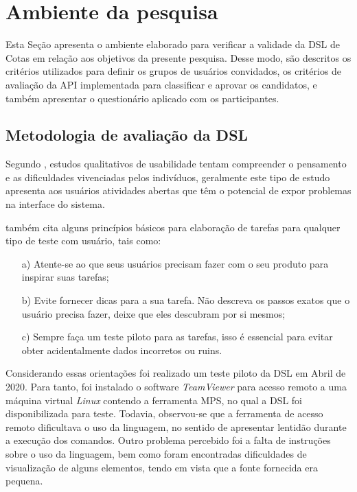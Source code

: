 \section{Ambiente da pesquisa}
\label{ambiente}
 Esta Seção apresenta o ambiente elaborado para verificar a validade da DSL de Cotas em relação aos objetivos da presente pesquisa. Desse modo, são descritos os critérios utilizados para definir os grupos de usuários convidados, os critérios de avaliação da \gls{API} implementada para classificar e aprovar os candidatos, e também apresentar o questionário aplicado com os participantes.
 
\subsection{Metodologia de avaliação da DSL}
\label{metododsl}

 Segundo , estudos qualitativos de usabilidade tentam compreender o pensamento e as dificuldades vivenciadas pelos indivíduos, geralmente este tipo de estudo apresenta aos usuários atividades abertas que têm o potencial de expor problemas na interface do sistema. 
 
  também cita alguns princípios básicos para elaboração de tarefas para qualquer tipo de teste com usuário, tais como:
 
 \begin{enumerate}
    \item[a)] Atente-se ao que seus usuários precisam fazer com o seu produto para inspirar suas tarefas;
    \item[b)] Evite fornecer dicas para a sua tarefa. Não descreva os passos exatos que o usuário precisa fazer, deixe que eles descubram por si mesmos;
    \item[c)] Sempre faça um teste piloto para as tarefas, isso é essencial para evitar obter acidentalmente dados incorretos ou ruins.
    
\end{enumerate}
 
 Considerando essas orientações foi realizado um teste piloto da \gls{DSL} em Abril de 2020. Para tanto, foi instalado o software \textit{TeamViewer} para acesso remoto a uma máquina virtual \textit{Linux} contendo a ferramenta \gls{MPS}, no qual a DSL foi disponibilizada para teste. Todavia, observou-se que a ferramenta de acesso remoto dificultava o uso da linguagem, no sentido de apresentar lentidão durante a execução dos comandos. Outro problema percebido foi a falta de instruções sobre o uso da linguagem, bem como foram encontradas dificuldades de visualização de alguns elementos, tendo em vista que a fonte fornecida era pequena.
 
